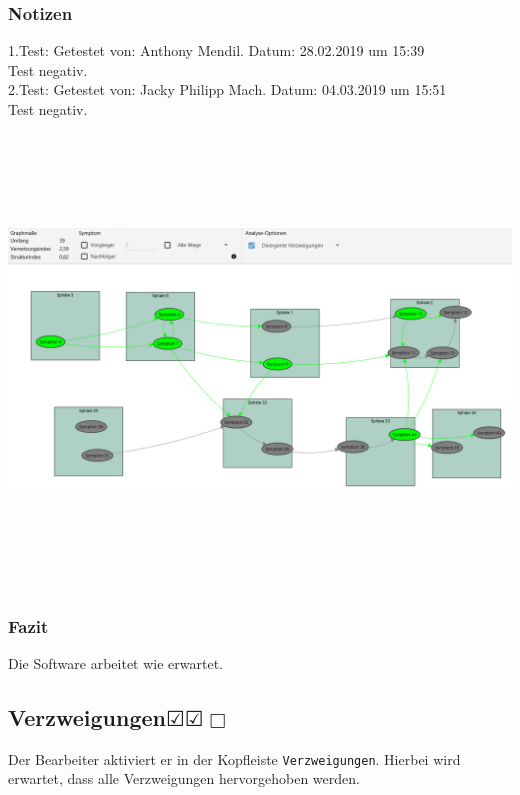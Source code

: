 \documentclass[enabledeprecatedfontcommands]{scrartcl}
\newcommand{\subsectiont}[2]{\subsection[#1]{#1{\normalsize\normalfont #2}}}
\newcommand{\leer}{$\Box$}
\newcommand{\ok}{$\CheckedBox$}
\begin{document}
\subsubsection{Notizen}
1.Test: Getestet von: Anthony Mendil. Datum: 28.02.2019 um 15:39 \\
Test negativ. \\
2.Test: Getestet von: Jacky Philipp Mach. Datum: 04.03.2019 um 15:51 \\
Test negativ.
\begin{center}
\includegraphics[height=12cm, angle=90]{analysedivergenteVerzweigungen.PNG}
\end{center}
\subsubsection{Fazit}
Die Software arbeitet wie erwartet.

\subsectiont{Verzweigungen}{\dotfill\ok\ok\leer}
Der Bearbeiter aktiviert er in der Kopfleiste \texttt{Verzweigungen}. Hierbei wird erwartet, dass alle Verzweigungen hervorgehoben werden. 
\end{document}

